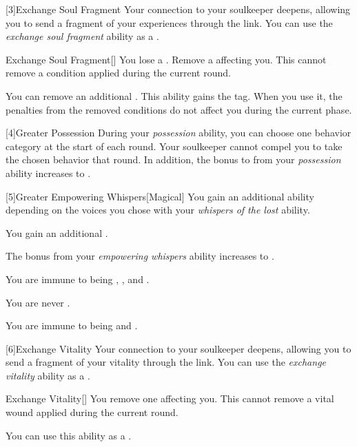         [3]{Exchange Soul Fragment} Your connection to your soulkeeper deepens, allowing you to send a fragment of your experiences through the link.
        You can use the \textit{exchange soul fragment} ability as a .
        \begin{freeability}{Exchange Soul Fragment}[]
            You lose a .
            Remove a  affecting you.
            This cannot remove a condition applied during the current round.

            \rankline
             You can remove an additional .
             This ability gains the  tag.
            When you use it, the penalties from the removed conditions do not affect you during the current phase.
        \end{freeability}

        [4]{Greater Possession} During your \textit{possession} ability, you can choose one behavior category at the start of each round.
        Your soulkeeper cannot compel you to take the chosen behavior that round.
        In addition, the bonus to  from your \textit{possession} ability increases to .

        [5]{Greater Empowering Whispers}[Magical] You gain an additional ability depending on the voices you chose with your \textit{whispers of the lost} ability.
        {
             You gain an additional .

             The bonus from your \textit{empowering whispers} ability increases to .

             You are immune to being , , and .

             You are never .

             You are immune to being  and .
        }

        [6]{Exchange Vitality} Your connection to your soulkeeper deepens, allowing you to send a fragment of your vitality through the link.
        You can use the \textit{exchange vitality} ability as a .
        \begin{apability}{Exchange Vitality}[]
            You remove one  affecting you.
            This cannot remove a vital wound applied during the current round.

            \rankline
             You can use this ability as a .
        \end{apability}

